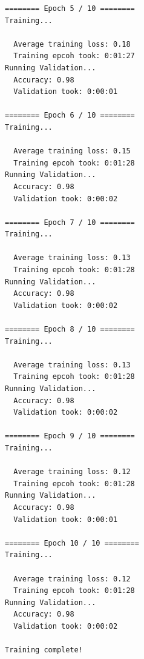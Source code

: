 \documentclass{article}
\begin{document}
\begin{lstlisting}
======== Epoch 5 / 10 ========
Training...

  Average training loss: 0.18
  Training epcoh took: 0:01:27
Running Validation...
  Accuracy: 0.98
  Validation took: 0:00:01

======== Epoch 6 / 10 ========
Training...

  Average training loss: 0.15
  Training epcoh took: 0:01:28
Running Validation...
  Accuracy: 0.98
  Validation took: 0:00:02

======== Epoch 7 / 10 ========
Training...

  Average training loss: 0.13
  Training epcoh took: 0:01:28
Running Validation...
  Accuracy: 0.98
  Validation took: 0:00:02

======== Epoch 8 / 10 ========
Training...

  Average training loss: 0.13
  Training epcoh took: 0:01:28
Running Validation...
  Accuracy: 0.98
  Validation took: 0:00:02

======== Epoch 9 / 10 ========
Training...

  Average training loss: 0.12
  Training epcoh took: 0:01:28
Running Validation...
  Accuracy: 0.98
  Validation took: 0:00:01

======== Epoch 10 / 10 ========
Training...

  Average training loss: 0.12
  Training epcoh took: 0:01:28
Running Validation...
  Accuracy: 0.98
  Validation took: 0:00:02

Training complete!
\end{lstlisting}
\end{document}
